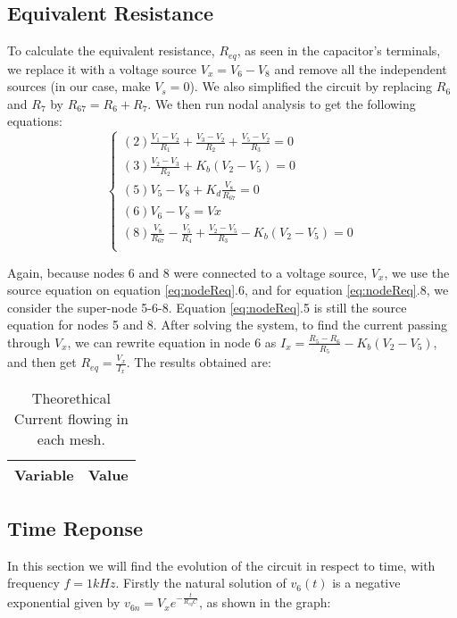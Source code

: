 \subsection{Equivalent Resistance}
To calculate the equivalent resistance, $R_{eq}$, as seen in the capacitor's terminals, we replace it with a voltage source $V_x=V_6-V_8$ and remove all the independent sources (in our case, make $V_s=0$). We also simplified the circuit by replacing $R_6$ and $R_7$ by $R_{67}=R_6+R_7$. We then run nodal analysis to get the following equations:
\begin{equation}\label{eq:nodeReq}
\begin{cases}
  (2) \frac{V_1 - V_2}{R_1} + \frac{V_3 - V_2}{R_2} + \frac{V_5 - V_2}{R_3} = 0 \\
  (3) \frac{V_2 - V_3}{R_2} + K_b(V_2 - V_5) = 0 \\
  (5) V_5 - V_8 + K_d\frac{V_8}{R_{67}} = 0 \\
  (6) V_6 - V_8 = Vx \\
  (8) \frac{V_8}{R_{67}} - \frac{V_5}{R_4} + \frac{V_2 - V_5}{R_3} - K_b(V_2-V_5)= 0 \\
\end{cases}
\end{equation}

Again, because nodes 6 and 8 were connected to a voltage source, $V_x$, we use the source equation on equation \ref{eq:nodeReq}.6, and for equation \ref{eq:nodeReq}.8, we consider the super-node 5-6-8. Equation \ref{eq:nodeReq}.5 is still the source equation for nodes 5 and 8.
After solving the system, to find the current passing through $V_x$, we can rewrite equation in node 6 as $I_x= \frac{R_5 - R_6}{R_5} - K_b(V_2 - V_5)$, and then get $R_{eq}=\frac{V_x}{I_x}$.
The results obtained are:

\begin{table}[H]
  \centering
  \begin{tabular}{|l|r|}
    \hline
        {\bf Variable} & {\bf Value} \\ \hline
        
  \end{tabular}
  \caption{Theorethical Current flowing in each mesh.}
  \label{tab:mesh}
\end{table}


\subsection{Time Reponse}
In this section we will find the evolution of the circuit in respect to time, with frequency $f= 1kHz$.
Firstly the natural solution of $v_6(t)$ is a negative exponential given by $v_{6n}=V_xe^{-\frac{t}{R_{eq}C}}$, as shown in the graph:

